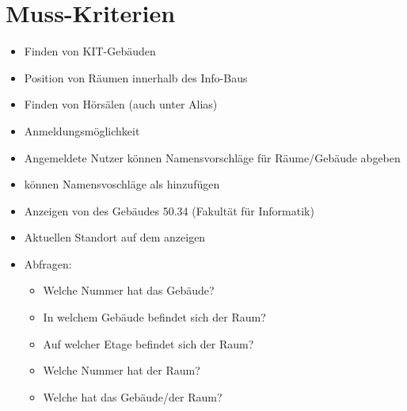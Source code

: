 \section{Muss-Kriterien}

\begin{itemize}

    \item Finden von KIT-Gebäuden
    \item Position von Räumen innerhalb des Info-Baus
    \item Finden von Hörsälen (auch unter Alias)
    \item Anmeldungsmöglichkeit
    \item Angemeldete Nutzer können Namensvorschläge für Räume/Gebäude abgeben
    \item %
     können Namensvoschläge als %
      hinzufügen
    \item Anzeigen von %
     des Gebäudes 50.34 (Fakultät für Informatik)
    \item Aktuellen Standort auf dem %
     anzeigen
    \item Abfragen:
        \begin{itemize}
            \item Welche Nummer hat das Gebäude?
            \item In welchem Gebäude befindet sich der Raum?
            \item Auf welcher Etage befindet sich der Raum?
            \item Welche Nummer hat der Raum?
            \item Welche %
             hat das Gebäude/der Raum?
        \end{itemize}


\end{itemize}
